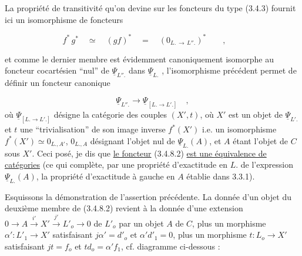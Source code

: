\begin{center}
\end{center}
La propriété de transitivité qu'on devine sur les foncteurs du type (3.4.3) fournit ici un isomorphisme de foncteurs

\begin{equation*}
f^* \, g^* \quad \simeq \quad (gf)^* \quad = \quad (0_{L. \,\to\, L''.})^* \qquad , \qquad 
\end{equation*}


 et comme le dernier membre est évidemment canoniquement isomorphe au foncteur cocartésien ``nul'' de $\underline{\Psi}_{L''.}$ dans $\underline{\Psi}_{L.}$ , l'isomorphisme précédent permet de définir un foncteur canonique

\begin{equation}\tag{3.4.8.2}
\underline{\Psi}_{L''.} \longrightarrow \underline{\Psi}_{[L. \longrightarrow L'.]} \quad ,
\end{equation}
où $\underline{\Psi}_{[L. \longrightarrow L'.]}$ désigne la catégorie des couples $(X',t)$, où $X'$ est un objet de $\underline{\Psi}_{L'.}$ et $t$ une ``trivialisation'' de son image inverse $f^*(X')$ i.e. un isomorphisme $f^*(X') \simeq 0_{L.,A'}$, $0_{L.,A}$ désignant l'objet nul de $\underline{\Psi}_{L.}(A)$, et $A$ étant l'objet de $C$ sous $X'$. Ceci posé, je dis que \underline{le foncteur} (3.4.8.2) \underline{est une équivalence de catégories} (ce qui complète, par une propriété d'exactitude en $L.$ de l'expression $\underline{\Psi}_{L.}(A)$, la propriété d'exactitude à gauche en $A$ établie dans 3.3.1).

Esquissons la démonstration de l'assertion précédente. La donnée d'un objet du deuxième membre de (3.4.8.2) revient à la donnée d'une extension $0 \longrightarrow A \stackrel{i'}{\longrightarrow} X' \stackrel{j'}{\longrightarrow} L'_o \longrightarrow 0$ de $L'_o$ par un objet $A$ de $C$, plus un morphisme $\alpha' : L'_1 \longrightarrow X'$ satisfaisant $j\alpha' = d'_o$ et $\alpha'd'_1 = 0$, plus un morphisme $t : L_o \longrightarrow X'$ satisfaisant $jt = f_o$ et $td_o = \alpha'f_1$, cf. diagramme ci-dessous :

